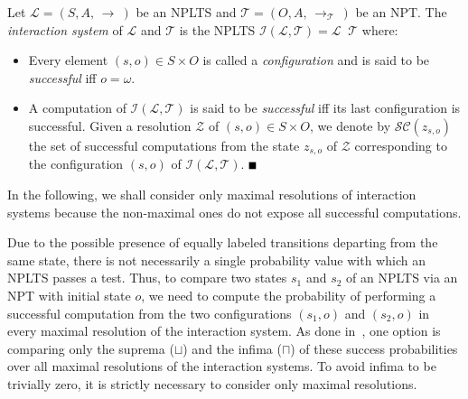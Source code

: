 \documentclass{LMCS}
\newcommand{\cali}
        {\mathcal{I}}
\newcommand{\call}
        {\mathcal{L}}
\newcommand{\calsc}
        {\mathcal{SC}}
\newcommand{\calt}
        {\mathcal{T}}
\newcommand{\calz}
        {\mathcal{Z}}
\newcommand{\arrow}[2]
        {\, {\auxarrow\limits^{#1}}_{#2} \,}
\newcommand{\auxarrow}
{\mathop{\longrightarrow}}
\newcommand{\pco}[1]
	{\mathop{\Vert_{#1}}}
\newcommand{\fullbox}
	{{\mbox{}\nolinebreak\hfill{$\rule{2mm}{2mm}$}}}
\begin{document}
	\begin{defi}

Let $\call = (S, A, \! \arrow{}{} \!)$ be an NPLTS and $\calt = (O, A, \! \arrow{}{\calt} \!)$ be an NPT.
The \emph{interaction system} of $\call$ and $\calt$ is the NPLTS $\cali(\call, \calt) = \call \pco{} \calt$
where:

		\begin{itemize}

\item Every element $(s, o) \in S \times O$ is called a \emph{configuration} and is said to be
\emph{successful} iff $o = \omega$.

\item A computation of $\cali(\call, \calt)$ is said to be \emph{successful} iff its last configuration is
successful. Given a resolution $\calz$ of $(s, o) \in S \times O$, we denote by $\calsc(z_{s, o})$ the set
of successful computations from the state $z_{s, o}$ of $\calz$ corresponding to the configuration $(s, o)$
of $\cali(\call, \calt)$.
\fullbox

		\end{itemize}

	\end{defi}

In the following, we shall consider only maximal resolutions of interaction systems because the non-maximal
ones do not expose all successful computations.

Due to the possible presence of equally labeled transitions departing from the same state, there is not
necessarily a single probability value with which an NPLTS passes a test. Thus, to compare two states
$s_{1}$ and $s_{2}$ of an NPLTS via an NPT with initial state $o$, we need to compute the probability of
performing a successful computation from the two configurations $(s_{1}, o)$ and $(s_{2}, o)$ in every
maximal resolution of the interaction system. As done in~\cite{YL92,JY95,Seg96,DGHM08}, one option is
comparing only the suprema ($\sqcup$) and the infima ($\sqcap$) of these success probabilities over all
maximal resolutions of the interaction systems. To avoid infima to be trivially zero, it is strictly
necessary to consider only maximal resolutions.
\end{document}
